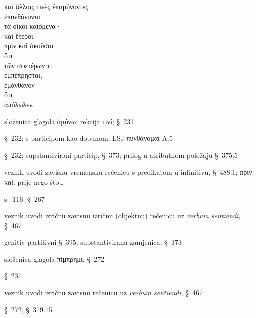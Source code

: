 {\large
\begin{greek}
\noindent καὶ ἄλλοις τινὲς ἐπαμύνοντες \\
ἐπυνθάνοντο \\
τὰ οἴκοι καιόμενα· \\
καὶ ἕτεροι \\
\tabto{2em} πρὶν καὶ ἀκοῦσαι \\
\tabto{4em} ὅτι\\
\tabto{6em} τῶν σφετέρων τι \\
\tabto{4em} ἐμπέπρησται, \\
ἐμάνθανον \\
\tabto{2em} ὅτι \\
\tabto{4em} ἀπόλωλεν. \\


\end{greek}
}

\begin{description}[noitemsep]
\item[ἐπαμύνοντες] složenica glagola \textgreek[variant=ancient]{ἀμύνω;} rekcija τινί; §~231
\item[ἐπυνθάνοντο] §~232; s participom kao dopunom, LSJ \textgreek[variant=ancient]{πυνθάνομαι} A.5
\item[τὰ οἴκοι καιόμενα] §~232; supstantivirani particip, §~373; prilog u atributnom položaju §~375.5
\item[πρὶν] veznik uvodi zavisnu vremensku rečenicu s predikatom u infinitivu, §~488.1; πρὶν καὶ: prije nego što\dots
\item[ἀκοῦσαι] s.~116, §~267
\item[ὅτι] veznik uvodi izričnu zavisnu izričnu (objektnu) rečenicu uz \textit{verbum sentiendi}, §~467
\item[τῶν σφετέρων] genitiv partitivni §~395; supstantivirana zamjenica, §~373
\item[ἐμπέπρησται] složenica glagola \textgreek[variant=ancient]{πίμπρημι,} §~272
\item[ἐμάνθανον] §~231
\item[ὅτι] veznik uvodi izričnu zavisnu rečenicu uz \textit{verbum sentiendi}, §~467
\item[ἀπόλωλεν] §~272, §~319.15

\end{description}



